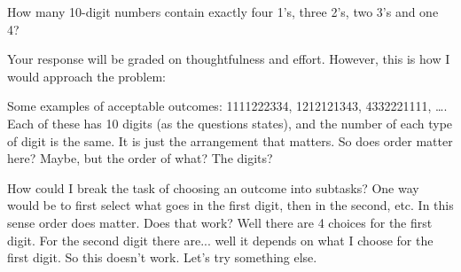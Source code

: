 \documentclass[10pt]{exam}
\begin{document}
\begin{questions}
  \begin{solution}
  \end{solution}

\question[4] How many 10-digit numbers contain exactly four 1's, three 2's, two 3's and one 4?
\begin{solution}
Your response will be graded on thoughtfulness and effort.  However, this is how I would approach the problem:

Some examples of acceptable outcomes: 1111222334, 1212121343, 4332221111, \ldots.  Each of these has 10 digits (as the questions states), and the number of each type of digit is the same.  It is just the arrangement that matters.  So does order matter here?  Maybe, but the order of what?  The digits?  

How could I break the task of choosing an outcome into subtasks?  One way would be to first select what goes in the first digit, then in the second, etc.  In this sense order does matter.  Does that work?  Well there are 4 choices for the first digit.  For the second digit there are... well it depends on what I choose for the first digit.  So this doesn't work.  Let's try something else.


\end{solution}
\end{questions}
\end{document}
